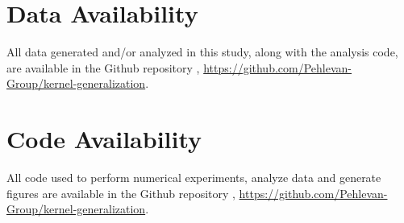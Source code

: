 \documentclass[11pt]{article}
\begin{document}
\section*{Data Availability}

All data generated and/or analyzed in this study, along with the analysis code, are available in the Github repository  \cite{codeanddata2021canatar}, \href{https://github.com/Pehlevan-Group/kernel-generalization}{https://github.com/Pehlevan-Group/kernel-generalization}.

\section*{Code Availability}

All code used to perform numerical experiments, analyze data and generate figures are available in the Github repository \cite{codeanddata2021canatar}, \href{https://github.com/Pehlevan-Group/kernel-generalization}{https://github.com/Pehlevan-Group/kernel-generalization}.

%  
% 
\end{document}

